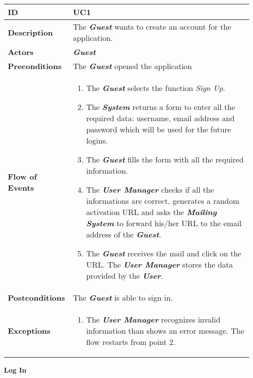 \begin{tabularx}{\linewidth}{| l | X |}
	\hline
	\textbf{ID} & UC1\\
	
	\hline
	\textbf{Description} & The \textbf{\textit{Guest}} wants to create an account for the application.\\
	
	\hline
	\textbf{Actors} & \textbf{\textit{Guest}}\\
	
	\hline
	\textbf{Preconditions} & The \textbf{\textit{Guest}} opened the application\\
	
	\hline
	\textbf{Flow of Events} & \parbox{0.7\textwidth}{\begin{enumerate}
			\item The \textbf{\textit{Guest}} selects the function \textit{Sign Up}.
			\item The \textbf{\textit{System}} returns a form to enter all the required data: username, email address and password which will be used for the future logins.
			\item The \textbf{\textit{Guest}} fills the form with all the required information.
			\item The \textbf{\textit{User Manager}} checks if all the informations are correct, generates a random activation URL and asks the \textbf{\textit{Mailing System}} to forward his/her URL to the email address of the \textbf{\textit{Guest}}.
			\item The \textbf{\textit{Guest}} receives the mail and click on the URL. The \textbf{\textit{User Manager}} stores the data provided by the \textbf{\textit{User}}.
	\end{enumerate}}\\
	
	\hline
	\textbf{Postconditions} & The \textbf{\textit{Guest}} is able to sign in.\\
	
	\hline
	\textbf{Exceptions} & \parbox{0.7\textwidth}{ \begin{enumerate}
			\item The \textbf{\textit{User Manager}} recognizes invalid information than shows an error message. The flow restarts from point 2.
		\end{enumerate}}\\
	
	\hline
	
\end{tabularx}
\newpage
\begin{center}
	\textbf{Log In}
\end{center}

